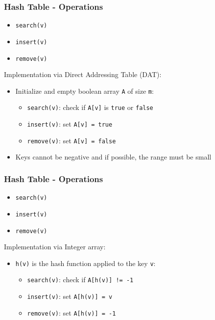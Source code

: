 \documentclass{beamer}
\begin{document}
\begin{frame}[fragile]
\frametitle{Hash Table - Operations}
	\begin{itemize}
		\item \verb|search(v)|
		\item \verb|insert(v)|
		\item \verb|remove(v)|
	\end{itemize}
	\vspace{0.5cm}
	Implementation via \color{blue}Direct Addressing Table (DAT)\color{black}:
	\begin{itemize}
		\item Initialize and empty boolean array \verb|A| of size \verb|m|:
			\begin{itemize}
				\item \verb|search(v)|: check if \verb|A[v]| is \verb|true| or \verb|false|
				\item \verb|insert(v)|: set \verb|A[v] = true|
				\item \verb|remove(v)|: set \verb|A[v] = false|
			\end{itemize}
		\item Keys cannot be negative and if possible, the range must be small
	\end{itemize}
\end{frame}

\begin{frame}[fragile]
\frametitle{Hash Table - Operations}
	\begin{itemize}
		\item \verb|search(v)|
		\item \verb|insert(v)|
		\item \verb|remove(v)|
	\end{itemize}
	\vspace{0.5cm}
	Implementation via \color{blue}Integer array\color{black}:
	\begin{itemize}
		\item \verb|h(v)| is the hash function applied to the key \verb|v|:
			\begin{itemize}
				\item \verb|search(v)|: check if \verb|A[h(v)] != -1|
				\item \verb|insert(v)|: set \verb|A[h(v)] = v|
				\item \verb|remove(v)|: set \verb|A[h(v)] = -1|
			\end{itemize}
	\end{itemize}
\end{frame}
\end{document}
